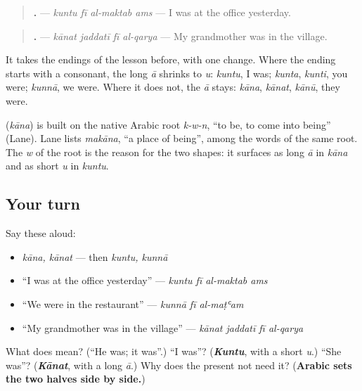 \begin{quote}
\textbf{   .} — \emph{kuntu fī al-maktab ams} — I was at the office yesterday.
\end{quote}

\begin{quote}
\textbf{   .} — \emph{kānat jaddatī fī al-qarya} — My grandmother was in the village.
\end{quote}

It takes the endings of the lesson before, with one change. Where the ending starts with a consonant, the long \emph{ā} shrinks to \emph{u}: \emph{kuntu}, I was; \emph{kunta}, \emph{kunti}, you were; \emph{kunnā}, we were. Where it does not, the \emph{ā} stays: \emph{kāna}, \emph{kānat}, \emph{kānū}, they were.

\begin{cousinweb}
\textbf{} (\emph{kāna}) is built on the native Arabic root \emph{k-w-n}, \textquotedblleft{}to be, to come into being\textquotedblright{} (Lane). Lane lists \emph{makāna}, \textquotedblleft{}a place of being\textquotedblright{}, among the words of the same root. The \emph{w} of the root is the reason for the two shapes: it surfaces as long \emph{ā} in \emph{kāna} and as short \emph{u} in \emph{kuntu}.
\end{cousinweb}

\subsection*{Your turn}
Say these aloud:

\begin{itemize}
\raggedright
  \item \emph{kāna, kānat} — then \emph{kuntu, kunnā}
  \item \textquotedblleft{}I was at the office yesterday\textquotedblright{} — \emph{kuntu fī al-maktab ams}
  \item \textquotedblleft{}We were in the restaurant\textquotedblright{} — \emph{kunnā fī al-maṭʿam}
  \item \textquotedblleft{}My grandmother was in the village\textquotedblright{} — \emph{kānat jaddatī fī al-qarya}
\end{itemize}

\begin{tcolorbox}[breakable,colback=teal!4,colframe=teal!35!black,title={Before you move on}]
What does  mean? (\textquotedblleft{}He was; it was\textquotedblright{}.) \textquotedblleft{}I was\textquotedblright{}? (\emph{\textbf{Kuntu}}, with a short \emph{u}.) \textquotedblleft{}She was\textquotedblright{}? (\emph{\textbf{Kānat}}, with a long \emph{ā}.) Why does the present not need it? (\textbf{Arabic sets the two halves side by side.})
\end{tcolorbox}
